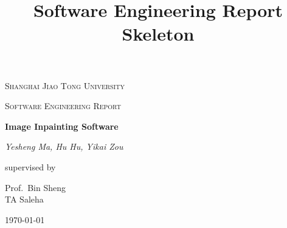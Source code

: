 \documentclass[notitlepage]{report}
\title{Software Engineering Report Skeleton}
\begin{document}
\begin{titlepage}
	\centering
	{\scshape\LARGE Shanghai Jiao Tong University \par}
	\vspace{1cm}
	{\scshape\Large Software Engineering Report\par}
	\vspace{1.5cm}
	{\huge\bfseries Image Inpainting Software\par}
	\vspace{2cm}
	{\Large\itshape Yesheng Ma, Hu Hu, Yikai Zou\par}
	\vfill
	supervised by\par
	Prof.~Bin Sheng \\ TA Saleha

	\vfill

	{\large \today\par}
\end{titlepage}

\mbox{}
\thispagestyle{empty}
\newpage
\newpage

\newpage

\newpage

\newpage

\newpage

\newpage






\newpage


\end{document}
